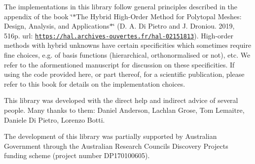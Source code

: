 The implementations in this library follow general principles described in the appendix of the book \char`\"{}$\ast$\+The Hybrid High-\/\+Order Method for Polytopal Meshes\+: Design, Analysis, and Applications$\ast$\char`\"{} (D. A. Di Pietro and J. Droniou. 2019, 516p. url\+: \href{https://hal.archives-ouvertes.fr/hal-02151813}{\tt https\+://hal.\+archives-\/ouvertes.\+fr/hal-\/02151813}). High-\/order methods with hybrid unknowns have certain specificities which sometimes require fine choices, e.\+g. of basis functions (hierarchical, orthonormalised or not), etc. We refer to the aformentioned manuscript for discussion on these specificities. If using the code provided here, or part thereof, for a scientific publication, please refer to this book for details on the implementation choices.

This library was developed with the direct help and indirect advice of several people. Many thanks to them\+: Daniel Anderson, Lachlan Grose, Tom Lemaitre, Daniele Di Pietro, Lorenzo Botti.

The development of this library was partially supported by Australian Government through the Australian Research Council\textquotesingle{}s Discovery Projects funding scheme (project number D\+P170100605). 